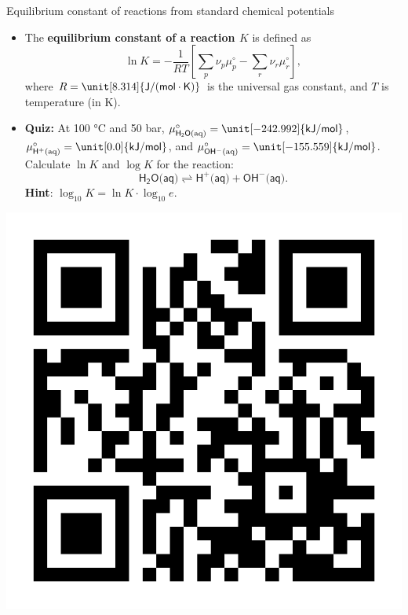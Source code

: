 %
%
%
\begin{frame}[<+->]{Equilibrium constant of reactions from standard chemical potentials}
\begin{itemize}
\item The \textbf{\alert{equilibrium constant of a reaction $K$}} is
defined as
\[
\boxed{
\ln K=-\frac{1}{RT}\left[\sum_{p}\nu_{p}\mu_{p}^{\circ}-\sum_{r}\nu_{r}\mu_{r}^{\circ}\right],
}
\]
where $R=\unit[8.314]{\mathsf{J/(mol\cdot K)}}$ is the universal
gas constant, and $T$ is temperature (in K). 
%
\vskip 10pt
\item \alert{\textbf{Quiz:}} At 100 °C and 50 bar, ${\mu_{\mathsf{H_{2}O\text{(aq)}}}^{\circ}=\unit[-242.992]{\mathsf{kJ/mol}}}$,
${\mu_{\mathsf{H^{+}\text{(aq)}}}^{\circ}=\unit[0.0]{\mathsf{kJ/mol}}}$,
and ${\mu_{\mathsf{OH^{-}\text{(aq)}}}^{\circ}=\unit[-155.559]{\mathsf{kJ/mol}}}$.
Calculate $\ln K$ and $\log K$ for the reaction:
\[
\mathsf{H_{2}O\text{(aq)}}\rightleftharpoons\mathsf{H^{+}\text{(aq)}+OH^{-}\text{(aq)}}.
\]
\textbf{Hint}: $\log_{10} K = \ln K \cdot \log_{10} e$.
\end{itemize}
\centering
\vskip -73pt
\includegraphics[height=0.22\columnwidth, right]{figures/chemical-equilibrium/poll.png}


\end{frame}
